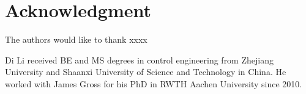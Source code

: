 \documentclass[journal,comsoc]{IEEEtran}
\theoremstyle{mytheoremstyle}
\theoremstyle{mytheoremstyle}
\theoremstyle{mytheoremstyle}
\begin{document}
\section*{Acknowledgment}

The authors would like to thank xxxx


\ifCLASSOPTIONcaptionsoff
  \newpage
\fi





%
%
%


% 

\begin{IEEEbiography}{Di Li}
received BE and MS degrees in control engineering from Zhejiang University and Shaanxi University of Science and Technology in China.
He worked with James Gross for his PhD in RWTH Aachen University since 2010.
\end{IEEEbiography}
\end{document}
